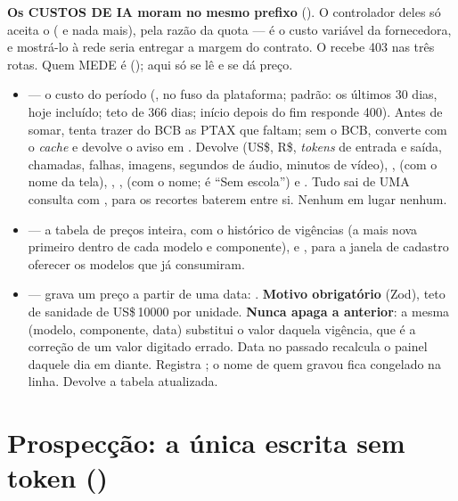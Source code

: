 \textbf{Os CUSTOS DE IA moram no mesmo prefixo} (). O
controlador deles só aceita o  ( e nada mais),
pela razão da quota --- é o custo variável da fornecedora, e mostrá-lo à rede seria entregar a
margem do contrato. O  recebe 403 nas três rotas. Quem
MEDE é  (); aqui só se lê e se dá preço.

\begin{itemize}
  \item {} --- o custo do período
    (, no fuso da plataforma; padrão: os últimos 30 dias, hoje
    incluído; teto de 366 dias; início depois do fim responde 400). Antes de
    somar, tenta trazer do BCB as PTAX que faltam; sem o BCB, converte com o
    \emph{cache} e devolve o aviso em . Devolve 
    (US\$, R\$, \emph{tokens} de entrada e saída, chamadas, falhas, imagens,
    segundos de áudio, minutos de vídeo), ,  (com o
    nome da tela), , ,  (com o
    nome;  é \enquote{Sem escola}) e . Tudo sai de
    UMA consulta com , para os recortes baterem entre si.
    Nenhum  em lugar nenhum.
  \item {} --- a tabela de preços
    inteira, com o histórico de vigências (a mais nova primeiro dentro de cada
    modelo e componente), e , para a janela de cadastro
    oferecer os modelos que já consumiram.
  \item {} --- grava um preço a partir
    de uma data: .
    \textbf{Motivo obrigatório} (Zod), teto de sanidade de US\$\,\num{10000}
    por unidade. \textbf{Nunca apaga a anterior}: a mesma (modelo, componente,
    data) substitui o valor daquela vigência, que é a correção de um valor
    digitado errado. Data no passado recalcula o painel daquele dia em diante.
    Registra ; o nome de quem gravou fica
    congelado na linha. Devolve a tabela atualizada.
\end{itemize}

\section{Prospecção: a única escrita sem token ()}

